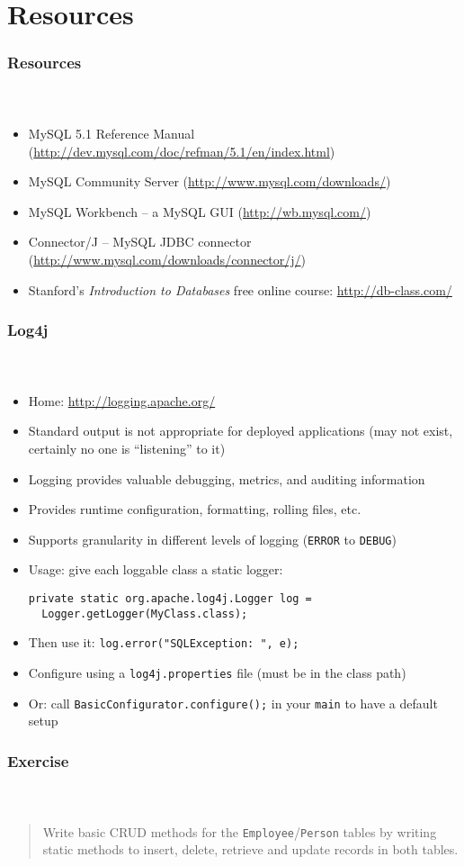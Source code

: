 \documentclass{beamer}
\begin{document}
\section{Resources}

\begin{frame}
  \frametitle{Resources}
  \framesubtitle{~}

\begin{itemize}
  \item MySQL 5.1 Reference Manual (\url{http://dev.mysql.com/doc/refman/5.1/en/index.html})
  \item MySQL Community Server (\url{http://www.mysql.com/downloads/})
  \item MySQL Workbench -- a MySQL GUI (\url{http://wb.mysql.com/})
  \item Connector/J -- MySQL JDBC connector (\url{http://www.mysql.com/downloads/connector/j/})
  \item Stanford's \emph{Introduction to Databases} free online course: \url{http://db-class.com/}
\end{itemize}

\end{frame}

\begin{frame}
  \frametitle{Log4j}
  \framesubtitle{~}

  \begin{itemize}
    \item Home: \url{http://logging.apache.org/}
    \item Standard output is not appropriate for deployed applications (may not exist, certainly no one is ``listening'' to it)
    \item Logging provides valuable debugging, metrics, and auditing information
    \item Provides runtime configuration, formatting, rolling files, etc.
    \framebreak
    \item Supports granularity in different levels of logging (\texttt{ERROR} to \texttt{DEBUG})
    \item Usage: give each loggable class  a static logger:\\
\begin{verbatim}
private static org.apache.log4j.Logger log = 
  Logger.getLogger(MyClass.class);
\end{verbatim}  
    \item Then use it: \texttt{log.error("SQLException: ", e);}
    \item Configure using a \texttt{log4j.properties} file (must be in the class path)
    \item Or: call \texttt{BasicConfigurator.configure();} in your \texttt{main} to have a default setup
  \end{itemize}

\end{frame}



\begin{frame}
  \frametitle{Exercise}
  \framesubtitle{~}

  \begin{quote}
    Write basic CRUD methods for the \texttt{Employee}/\texttt{Person} tables by writing
    static methods to insert, delete, retrieve and update records in both tables.
  \end{quote}

\end{frame}
\end{document}
